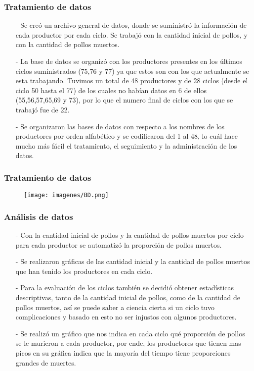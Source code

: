 \documentclass[11pt]{beamer}
\begin{document}
\begin{frame}
\frametitle{Tratamiento de datos}
\begin{itemize}
\justifying
\item[-]Se creó un archivo general de datos, donde se suministró la información de cada productor por cada ciclo. Se trabajó con la cantidad inicial de pollos, y con la cantidad de pollos muertos.
\item[-]La base de datos se organizó con los productores presentes en los últimos ciclos suministrados (75,76 y 77) ya que estos son con los que actualmente se esta trabajando. Tuvimos un total de 48 productores y de 28 ciclos (desde el ciclo 50 hasta el 77) de los cuales no habían datos en 6 de ellos (55,56,57,65,69 y 73), por lo que el numero final de ciclos con los que se trabajó fue de 22.
\item[-]Se organizaron las bases de datos con respecto a los nombres de los productores por orden alfabético y se codificaron del 1 al 48, lo cuál hace mucho más fácil el tratamiento, el seguimiento y la administración de los datos.
\end{itemize}
\end{frame}

\begin{frame}
\frametitle{Tratamiento de datos}
\begin{figure}[!h]
        \texttt{[image: imagenes/BD.png]}
        \label{figura1}
\end{figure}
\end{frame}


\begin{frame}
\frametitle{Análisis de datos}
\begin{itemize}
\justifying
\item[-]Con la cantidad inicial de pollos y la cantidad de pollos muertos por ciclo para cada productor se automatizó la proporción de pollos muertos.
\item[-]Se realizaron gráficas de las cantidad inicial y la cantidad de pollos muertos que han tenido los productores en cada ciclo.
\item[-]Para la evaluación de los ciclos también se decidió obtener estadísticas descriptivas, tanto de la cantidad inicial de pollos, como de la cantidad de pollos muertos, así se puede saber a ciencia cierta si un ciclo tuvo complicaciones y basado en esto no ser injustos con algunos productores.
\item[-]Se realizó un gráfico que nos indica en cada ciclo qué proporción de pollos se le murieron a cada productor, por ende, los productores que tienen mas picos en su gráfica indica que la mayoría del tiempo tiene proporciones grandes de muertes.
\end{itemize}
\end{frame}
\end{document}
